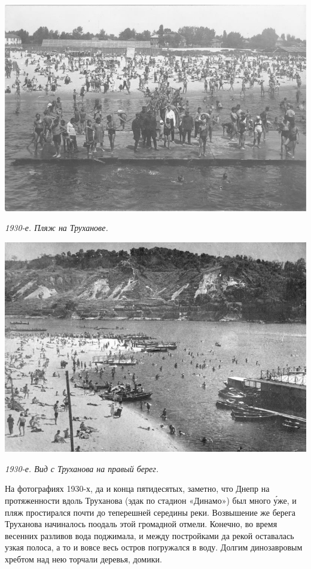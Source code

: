 \vspace*{\fill}
\newpage
\vspace*{\fill}
\begin{center}
\includegraphics[width=\linewidth]{chast-gorodki/cherto/tru03.jpg}

\textit{1930-е. Пляж на Труханове.}
\end{center}

\begin{center}
\includegraphics[width=\linewidth]{chast-gorodki/cherto/tru04.jpg}

\textit{1930-е. Вид с Труханова на правый берег.}
\end{center}
\vspace*{\fill}
\newpage

На фотографиях 1930-х, да и конца пятидесятых, заметно, что Днепр на протяженности вдоль Труханова (эдак по стадион «Динамо») был много \'уже, и пляж простирался почти до теперешней середины реки. Возвышение же берега Труханова начиналось поодаль этой громадной отмели. Конечно, во время весенних разливов вода поджимала, и между постройками да рекой оставалась узкая полоса, а то и вовсе весь остров погружался в воду. Долгим динозавровым хребтом над нею торчали деревья, домики.

